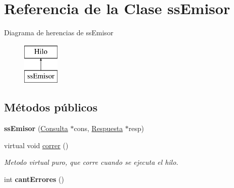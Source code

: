 \hypertarget{classssEmisor}{\section{\-Referencia de la \-Clase ss\-Emisor}
\label{classssEmisor}
}
\-Diagrama de herencias de ss\-Emisor\begin{figure}[H]
\begin{center}
\leavevmode
\includegraphics[height=2.000000cm]{classssEmisor}
\end{center}
\end{figure}
\subsection*{\-Métodos públicos}
\begin{DoxyCompactItemize}
\item 
\hypertarget{classssEmisor_ab4d4104b571673eaa590395706503b55}{{\bfseries ss\-Emisor} (\hyperlink{classConsulta}{\-Consulta} $\ast$cons, \hyperlink{classRespuesta}{\-Respuesta} $\ast$resp)}\label{classssEmisor_ab4d4104b571673eaa590395706503b55}

\item 
\hypertarget{classssEmisor_ae240067edee3e531af757361c5ecb5e8}{virtual void \hyperlink{classssEmisor_ae240067edee3e531af757361c5ecb5e8}{correr} ()}\label{classssEmisor_ae240067edee3e531af757361c5ecb5e8}

\begin{DoxyCompactList}\small\item\em \-Metodo virtual puro, que corre cuando se ejecuta el hilo. \end{DoxyCompactList}\item 
\hypertarget{classssEmisor_a2609fd4f833e1eca052b5b0c01391e7b}{int {\bfseries cant\-Errores} ()}\label{classssEmisor_a2609fd4f833e1eca052b5b0c01391e7b}

\end{DoxyCompactItemize}
